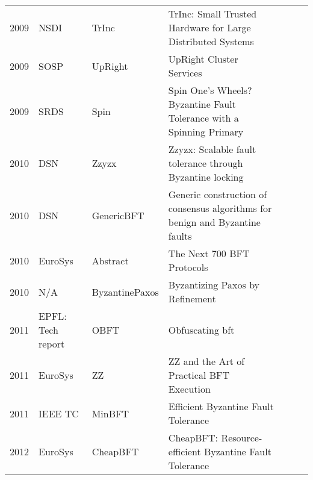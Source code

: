 \documentclass{article}
\begin{document}
\begin{landscape}
\begin{longtable}[c]{llll|l|l|l|}
2009 & NSDI              & TrInc                   & TrInc: Small Trusted Hardware for Large Distributed Systems                               &            &          &              \\ \cline{5-7} 
2009 & SOSP              & UpRight                 & UpRight Cluster Services                                                                  &            &          &              \\ \cline{5-7} 
2009 & SRDS              & Spin                    & Spin One’s Wheels? Byzantine Fault Tolerance with a Spinning Primary                      &            &          &              \\ \cline{5-7} 
2010 & DSN               & Zzyzx                   & Zzyzx: Scalable fault tolerance through Byzantine locking                                 &            &          &              \\ \cline{5-7} 
2010 & DSN               & GenericBFT              & Generic construction of consensus algorithms for benign and Byzantine faults              &            &          &              \\ \cline{5-7} 
2010 & EuroSys           & Abstract                & The Next 700 BFT Protocols                                                                &            &          &              \\ \cline{5-7} 
2010 & N/A               & ByzantinePaxos          & Byzantizing Paxos by Refinement                                                           &            &          &              \\ \cline{5-7} 
2011 & EPFL: Tech report & OBFT                    & Obfuscating bft                                                                           &            &          &              \\ \cline{5-7} 
2011 & EuroSys           & ZZ                      & ZZ and the Art of Practical BFT Execution                                                 &            &          &              \\ \cline{5-7} 
2011 & IEEE TC           & MinBFT                  & Efficient Byzantine Fault Tolerance                                                       &            &          &              \\ \cline{5-7} 
2012 & EuroSys           & CheapBFT                & CheapBFT: Resource-efficient Byzantine Fault Tolerance                                    &            &          &              \\ \cline{5-7} 

\end{longtable}
\end{landscape}
\end{document}
